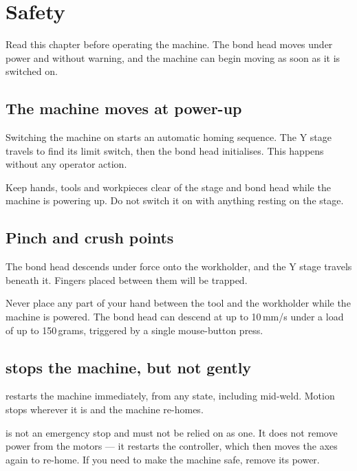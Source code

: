 \chapter{Safety}
\label{ch:safety}

\begin{wbwarning}
Read this chapter before operating the machine. The bond head moves under power
and without warning, and the machine can begin moving as soon as it is switched
on.
\end{wbwarning}

\section{The machine moves at power-up}

Switching the machine on starts an automatic homing sequence. The Y stage
travels to find its limit switch, then the bond head initialises. This happens
without any operator action.

\begin{wbwarning}
Keep hands, tools and workpieces clear of the stage and bond head while the
machine is powering up. Do not switch it on with anything resting on the stage.
\end{wbwarning}

\section{Pinch and crush points}

The bond head descends under force onto the workholder, and the Y stage travels
beneath it. Fingers placed between them will be trapped.

\begin{wbwarning}
Never place any part of your hand between the tool and the workholder while the
machine is powered. The bond head can descend at up to 10\,mm/s under a load of
up to 150\,grams, triggered by a single mouse-button press.
\end{wbwarning}

\section{ stops the machine, but not gently}

 restarts the machine immediately, from any state, including
mid-weld. Motion stops wherever it is and the machine re-homes.

\begin{wbwarning}
 is not an emergency stop and must not be relied on as one. It
does not remove power from the motors --- it restarts the controller, which
then moves the axes again to re-home. If you need to make the machine safe,
remove its power.
\end{wbwarning}

